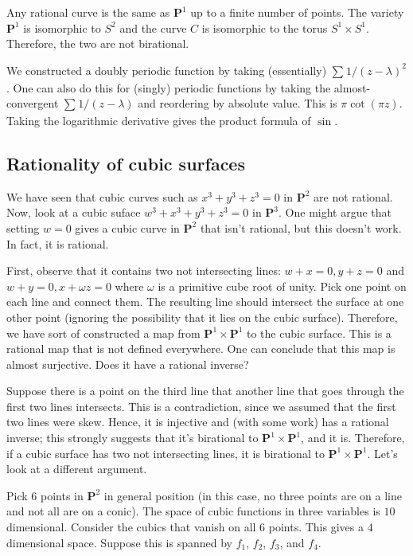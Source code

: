 \documentclass [11 pt, oneside, margin = 1 in] {article}
\begin{document}
Any rational curve is the same as $\mathbf{P}^1$ up to a finite number of points. The variety $\mathbf{P}^1$ is isomorphic to $S^2$ and the curve $C$ is isomorphic to the torus $S^1\times S^1$. Therefore, the two are not birational.

\begin{remark}
	We constructed a doubly periodic function by taking (essentially) $\sum_{}^{} 1/(z-\lambda)^2 $. One can also do this for (singly) periodic functions by taking the almost-convergent $\sum_{}^{} 1/(z-\lambda)$ and reordering by absolute value. This is $\pi\cot (\pi z)$. Taking the logarithmic derivative gives the product formula of $\sin$.
\end{remark}

\subsection{Rationality of cubic surfaces}
We have seen that cubic curves such as $x^3+y^3+z^3=0$ in $\mathbf{P}^2$ are not rational. Now, look at a cubic suface $w^3+x^3+y^3+z^3= 0$ in $\mathbf{P}^3$. One might argue that setting $w=0$ gives a cubic curve in $\mathbf{P}^2$ that isn't rational, but this doesn't work. In fact, it is rational.

First, observe that it contains two not intersecting lines: $w+x=0, y+z=0$ and $w+y=0, x+\omega z=0$ where $\omega$ is a primitive cube root of unity. Pick one point on each line and connect them. The resulting line should intersect the surface at one other point (ignoring the possibility that it lies on the cubic surface). Therefore, we have sort of constructed a map from $\mathbf{P}^1\times \mathbf{P}^1$ to the cubic surface. This is a rational map that is not defined everywhere. One can conclude that this map is almost surjective. Does it have a rational inverse?

Suppose there is a point on the third line that another line that goes through the first two lines intersects. This is a contradiction, since we assumed that the first two lines were skew. Hence, it is injective and (with some work) has a rational inverse; this strongly suggests that it's birational to $ \mathbf{P}^1\times \mathbf{P}^1$, and it is. Therefore, if a cubic surface has two not intersecting lines, it is birational to $\mathbf{P}^1\times \mathbf{P}^1$. Let's look at a different argument.

Pick $6$ points in $\mathbf{P}^2$ in general position (in this case, no three points are on a line and not all are on a conic). The space of cubic functions in three variables is $10$ dimensional. Consider the cubics that vanish on all $6$ points. This gives a $4$ dimensional space. Suppose this is spanned by $f_1$, $f_2$, $f_3$, and $f_4$.
\end{document}
